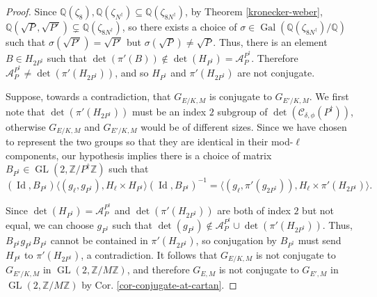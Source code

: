 \documentclass[11pt]{amsart}
\theoremstyle{definition}
\newcommand{\Q}{\mathbb{Q}}
\newcommand{\Z}{\mathbb{Z}}
\newcommand{\Gal}{\operatorname{Gal}}
\newcommand{\GL}{\operatorname{GL}}
\DeclareMathOperator{\Id}{Id}  %
\begin{document}
\begin{proof}
   Since $\Q(\zeta_{8}), \Q(\zeta_{N^{\dagger}}) \subseteq \Q(\zeta_{8 N^{\dagger}})$, by Theorem \ref{kronecker-weber}, $\Q(\sqrt{P}, \sqrt{P'}) \subsetneq \Q(\zeta_{8 N^{\dagger}})$, so there exists a choice of $\sigma \in \Gal(\Q(\zeta_{8 N^{\dagger}})/\Q)$ such that $\sigma(\sqrt{P'}) = \sqrt{P'}$ but $\sigma(\sqrt{P}) \neq \sqrt{P}$. Thus, there is an element $B \in H_{2P^{\dagger}}$ such that $\det(\pi'(B)) \notin \det(H_{P^{\dagger}}) = \mathcal{A}_{P}^{P^{\dagger}}$. Therefore $\mathcal{A}_{P}^{P^{\dagger}} \neq \det(\pi'(H_{2P^{\dagger}}))$, and so $H_{P^{\dagger}}$ and $\pi'(H_{2 P^{\dagger}})$ are not conjugate.

   Suppose, towards a contradiction, that $G_{E/K, M}$ is conjugate to $G_{E'/K, M}$. We first note that $\det(\pi'(H_{2P^{\dagger}}))$ must be an index $2$ subgroup of $\det(\mathcal{C}_{\delta, \phi}(P^{\dagger}))$, otherwise $G_{E/K, M}$ and $G_{E'/K, M}$ would be of different sizes. Since we have chosen to represent the two groups so that they are identical in their mod-$\ell$ components, our hypothesis implies there is a choice of matrix $B_{P^{\dagger}} \in \GL(2, \Z/P^{\dagger}\Z)$ such that 
    \[ (\Id, B_{P^{\dagger}})  \langle (g_{\ell}, g_{P^{\dagger}}), H_{\ell} \times H_{P^{\dagger}} \rangle (\Id, B_{P^{\dagger}})^{-1} = \langle (g_{\ell}, \pi'(g_{2P^{\dagger}})), H_{\ell} \times \pi'(H_{2P^{\dagger}}) \rangle. \]
    
   
   Since $\det(H_{P^{\dagger}}) = \mathcal{A}_{P}^{P^{\dagger}}$ and $\det(\pi'(H_{2P^{\dagger}}))$ are both of index $2$ but not equal, we can choose $g_{P^{\dagger}}$ such that $\det(g_{P^{\dagger}}) \notin \mathcal{A}_{P}^{P^{\dagger}} \cup \det(\pi'(H_{2P^{\dagger}}))$. Thus, $B_{P^{\dagger}} g_{P^{\dagger}} B_{P^{\dagger}}$ cannot be contained in $\pi'(H_{2P^{\dagger}})$, so conjugation by $B_{P^{\dagger}}$ must send $H_{P^{\dagger}}$ to $\pi'(H_{2P^{\dagger}})$, a contradiction. It follows that $G_{E/K, M}$ is not conjugate to $G_{E'/K, M}$ in $\GL(2, \Z/M\Z)$, and therefore $G_{E, M}$ is not conjugate to $G_{E', M}$ in $\GL(2, \Z/M\Z)$ by Cor. \ref{cor-conjugate-at-cartan}.
\end{proof}  





\end{document}
